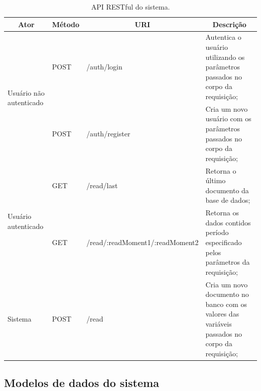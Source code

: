 \begin{table}[!h]
\huge
\centering
\caption{\label{tab:api} API RESTful do sistema.}
\begin{adjustbox}{max width=\textwidth}
\begin{tabular}{@{} p{8.5cm} l l p{10cm} @{}}
\hline
\multicolumn{1}{c}{\textbf{Ator}}                             & \multicolumn{1}{c}{\textbf{Método}} & \multicolumn{1}{c}{\textbf{URI}}                 & \multicolumn{1}{c}{\textbf{Descrição}}                                                    \\ \hline
\multicolumn{1}{l|}{\multirow{2}{*}{Usuário não autenticado}} & POST                                & \multicolumn{1}{l|}{/auth/login}                 & Autentica o usuário utilizando os parâmetros passados no corpo da requisição;                                                                      \\ \cline{2-4} 
\multicolumn{1}{l|}{}                                         & POST                                & \multicolumn{1}{l|}{/auth/register}              & Cria um novo usuário com os parâmetros passados no corpo da requisição;                   \\ \hline
\multicolumn{1}{l|}{\multirow{2}{*}{Usuário autenticado}}     & GET                                 & \multicolumn{1}{l|}{/read/last}                  & Retorna o último documento da base de dados;                                              \\ \cline{2-4} 
\multicolumn{1}{l|}{}                                         & GET                                 & \multicolumn{1}{l|}{/read/:readMoment1/:readMoment2} & Retorna os dados contidos período especificado pelos parâmetros da requisição;                                           \\ \hline
\multicolumn{1}{l|}{Sistema}                                  & POST                                & \multicolumn{1}{l|}{/read}                       & Cria um novo documento no banco com os valores das variáveis passados no corpo da requisição; \\ \hline                          
\end{tabular}
\end{adjustbox}
\end{table}


\subsection{Modelos de dados do sistema} \label{subsec:datamodel}

